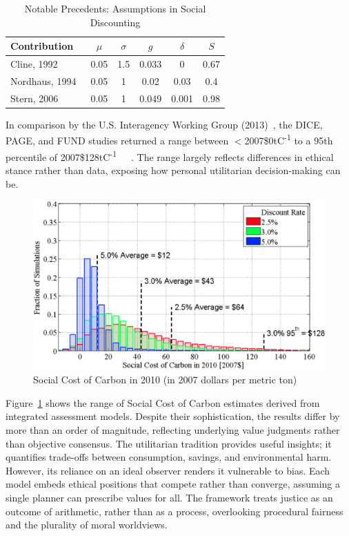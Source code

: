 \documentclass[12pt, oneside]{article}   	%
\begin{document}
\begin{table}[H]
\caption{Notable Precedents: Assumptions in Social Discounting}
\begin{center}
\begin{tabular}{| l | c | c | c | c | c |}
\hline
Contribution&$\mu$&$\sigma$&$g$&$\delta$&$S$\\
\hline
Cline, 1992~\cite{wc1}&0.05&1.5&0.033&0&0.67 \\
Nordhaus, 1994~\cite{wn1}&0.05&1&0.02&0.03&0.4 \\
Stern, 2006~\cite{ns1}&0.05&1&0.049&0.001&0.98 \\
\hline
\end{tabular}
\end{center}
\label{Social contributions table}
\end{table}

In comparison by the U.S. Interagency Working Group (2013)~\cite{iwg1}, the DICE, PAGE, and FUND studies returned a range between $<$2007\$0tC\textsuperscript{-1} to a 95th percentile of 2007\$128tC\textsuperscript{-1}~\cite{wn1}~\cite{ch1}~\cite{rsjt1}.
The range largely reflects differences in ethical stance rather than data, exposing how personal utilitarian decision-making can be.\\

\begin{figure}[H]
	\centering
	\includegraphics[width=1\textwidth]{scc}
	\caption{Social Cost of Carbon in 2010 (in 2007 dollars per metric ton)}
	\label{USA SCC figure}
\end{figure}

Figure~\ref{USA SCC figure} shows the range of Social Cost of Carbon estimates derived from integrated assessment models.
Despite their sophistication, the results differ by more than an order of magnitude, reflecting underlying value judgments rather than objective consensus.
The utilitarian tradition provides useful insights; it quantifies trade-offs between consumption, savings, and environmental harm.
However, its reliance on an ideal observer renders it vulnerable to bias.
Each model embeds ethical positions that compete rather than converge, assuming a single planner can prescribe values for all.
The framework treats justice as an outcome of arithmetic, rather than as a process, overlooking procedural fairness and the plurality of moral worldviews.\\
\end{document}
